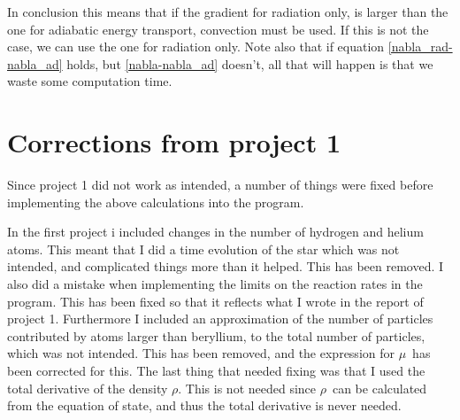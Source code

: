 \documentclass[a4paper,12pt]{article}
\begin{document}
In conclusion this means that if the gradient for radiation only, is larger than the one for adiabatic energy transport, convection must be used.
If this is not the case, we can use the one for radiation only.
Note also that if equation \ref{nabla_rad-nabla_ad} holds, but \ref{nabla-nabla_ad} doesn't, all that will happen is that we waste some computation time.

\section{Corrections from project 1}
Since project 1 did not work as intended, a number of things were fixed before implementing the above calculations into the program.

In the first project i included changes in the number of hydrogen and helium atoms. This meant that I did a time evolution of the star which was not intended, and complicated things more than it helped.
This has been removed.
I also did a mistake when implementing the limits on the reaction rates in the program. This has been fixed so that it reflects what I wrote in the report of project 1.
Furthermore I included an approximation of the number of particles contributed by atoms larger than beryllium, to the total number of particles, which was not intended. This has been removed, and the expression for $\mu$ has been corrected for this.
The last thing that needed fixing was that I used the total derivative of the density $\rho$. This is not needed since $\rho$ can be calculated from the equation of state, and thus the total derivative is never needed.
\end{document}
